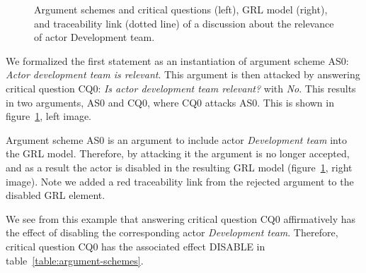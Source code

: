 \begin{figure}[ht!]
\centering
\caption{Argument schemes and critical questions (left), GRL model (right), and traceability link (dotted line) of a discussion about the relevance of actor Development team.}
\label{fig:examples:relevant-actor}
\end{figure}

We formalized the first statement as an instantiation of argument scheme AS0: \emph{Actor development team is relevant}. This argument is then attacked by answering critical question CQ0: \emph{Is actor development team relevant?} with \emph{No}. This results in two arguments, AS0 and CQ0, where CQ0 attacks AS0. This is shown in figure~\ref{fig:examples:relevant-actor}, left image.

Argument scheme AS0 is an argument to include actor \emph{Development team} into the GRL model. Therefore, by attacking it the argument is no longer accepted, and as a result the actor is disabled in the resulting GRL model (figure~\ref{fig:examples:relevant-actor}, right image). Note we added a red traceability link from the rejected argument to the disabled GRL element.

We see from this example that answering critical question CQ0 affirmatively has the effect of disabling the corresponding actor \emph{Development team}. Therefore, critical question CQ0 has the associated effect DISABLE in table~\ref{table:argument-schemes}.
